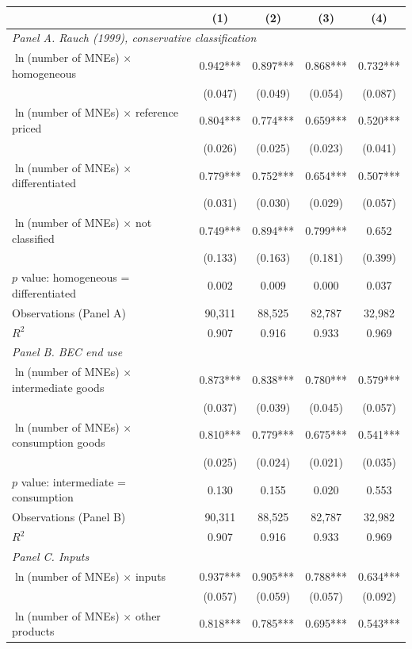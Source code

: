 \begin{tabular}{l*{4}{c}}
\toprule
 & (1) & (2) & (3) & (4) \\
\midrule
\multicolumn{5}{l}{\textit{Panel A. Rauch (1999), conservative classification}} \\
$\ln$(number of MNEs) $\times$ homogeneous & 0.942*** & 0.897*** & 0.868*** & 0.732*** \\
 & (0.047) & (0.049) & (0.054) & (0.087) \\
$\ln$(number of MNEs) $\times$ reference priced & 0.804*** & 0.774*** & 0.659*** & 0.520*** \\
 & (0.026) & (0.025) & (0.023) & (0.041) \\
$\ln$(number of MNEs) $\times$ differentiated & 0.779*** & 0.752*** & 0.654*** & 0.507*** \\
 & (0.031) & (0.030) & (0.029) & (0.057) \\
$\ln$(number of MNEs) $\times$ not classified & 0.749*** & 0.894*** & 0.799*** & 0.652 \\
 & (0.133) & (0.163) & (0.181) & (0.399) \\
$p$ value: homogeneous = differentiated & 0.002 & 0.009 & 0.000 & 0.037 \\
Observations (Panel A) & 90,311 & 88,525 & 82,787 & 32,982 \\
$R^2$ & 0.907 & 0.916 & 0.933 & 0.969 \\
\midrule
\multicolumn{5}{l}{\textit{Panel B. BEC end use}} \\
$\ln$(number of MNEs) $\times$ intermediate goods & 0.873*** & 0.838*** & 0.780*** & 0.579*** \\
 & (0.037) & (0.039) & (0.045) & (0.057) \\
$\ln$(number of MNEs) $\times$ consumption goods & 0.810*** & 0.779*** & 0.675*** & 0.541*** \\
 & (0.025) & (0.024) & (0.021) & (0.035) \\
$p$ value: intermediate = consumption & 0.130 & 0.155 & 0.020 & 0.553 \\
Observations (Panel B) & 90,311 & 88,525 & 82,787 & 32,982 \\
$R^2$ & 0.907 & 0.916 & 0.933 & 0.969 \\
\midrule
\multicolumn{5}{l}{\textit{Panel C. Inputs}} \\
$\ln$(number of MNEs) $\times$ inputs & 0.937*** & 0.905*** & 0.788*** & 0.634*** \\
 & (0.057) & (0.059) & (0.057) & (0.092) \\
$\ln$(number of MNEs) $\times$ other products & 0.818*** & 0.785*** & 0.695*** & 0.543*** \\

\end{tabular}
